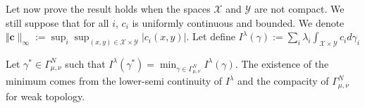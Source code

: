 \begin{prv*}

\medskip

Let now prove  the result holds when the spaces $\mathcal{X}$ and $\mathcal{Y}$ are not compact. We still suppose that for all $i$, $c_i$ is uniformly continuous and bounded. We denote $\Vert\mathbf{c}\rVert_\infty := \sup_i \sup_{(x,y)\in\mathcal{X}\times\mathcal{Y}} \lvert c_i(x,y)\rvert$. Let define $I^\lambda(\gamma):=\sum_i\lambda_i\int_{\mathcal{X}\times\mathcal{Y}}c_id\gamma_i$

Let $\gamma^*\in \Gamma^N_{\mu,\nu}$ such that $I^\lambda(\gamma^*) =\min_{\gamma\in\Gamma^N_{\mu,\nu}}I^\lambda(\gamma)$.  The existence of the minimum comes from the lower-semi continuity of $I^\lambda$ and  the compacity of $\Gamma^N_{\mu,\nu}$ for weak topology.


\end{prv*}
